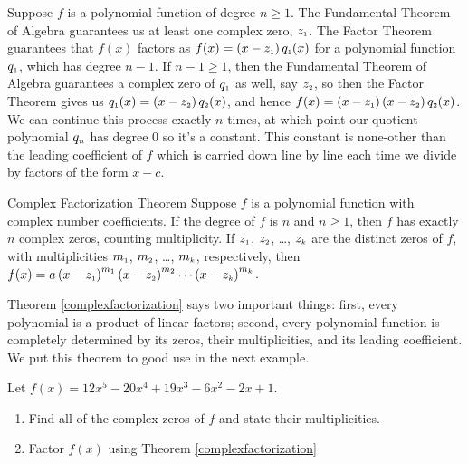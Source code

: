 Suppose  $f$ is a polynomial function of degree $n \geq 1$.  The Fundamental Theorem of Algebra guarantees us at least one complex zero, $z_{\mbox{\tiny $1$}}$.  The Factor Theorem guarantees that $f(x)$ factors as $f(x) = \left(x - z_{\mbox{\tiny $1$}}\right) q_{\mbox{\tiny $1$}}(x)$ for a polynomial function $q_{\mbox{\tiny $1$}}$,  which has degree $n-1$.  If $n-1 \geq 1$, then the Fundamental Theorem of Algebra guarantees a complex zero of $q_{\mbox{\tiny $1$}}$ as well, say $z_{\mbox{\tiny $2$}}$, so then the Factor Theorem gives us $q_{\mbox{\tiny $1$}}(x) = \left(x - z_{\mbox{\tiny $2$}}\right) q_{\mbox{\tiny $2$}}(x)$, and hence $f(x) = \left(x - z_{\mbox{\tiny $1$}}\right) \left(x - z_{\mbox{\tiny $2$}}\right) q_{\mbox{\tiny $2$}}(x)$.  We can continue this process exactly $n$ times, at which point our quotient polynomial $q_{\mbox{\tiny $n$}}$ has degree $0$ so it's a constant.  This constant is none-other than the leading coefficient of $f$ which is carried down line by line each time we divide by factors of the form $x-c$.


\begin{theorem1}[complexfactorization]{Complex Factorization Theorem} Suppose $f$ is a polynomial function with complex number coefficients.  If the degree of $f$ is $n$ and $n \geq 1$, then  $f$ has exactly $n$ complex zeros, counting multiplicity.  If $z_{\mbox{\tiny $1$}}$, $z_{\mbox{\tiny $2$}}$, \ldots, $z_{\mbox{\tiny $k$}}$ are the distinct zeros of $f$, with multiplicities $m_{\mbox{\tiny $1$}}$, $m_{\mbox{\tiny $2$}}$, \ldots, $m_{\mbox{\tiny $k$}}$, respectively, then $f(x) = a\left(x - z_{\mbox{\tiny $1$}}  \right)^{m_{\mbox{\tiny $1$}}}\left(x - z_{\mbox{\tiny $2$}}  \right)^{m_{\mbox{\tiny $2$}}} \cdots \left(x - z_{\mbox{\tiny $k$}}  \right)^{m_{\mbox{\tiny $k$}}}$. 

\end{theorem1}


Theorem \ref{complexfactorization} says two important things:  first, every polynomial is a product of linear factors;  second, every polynomial function is completely determined by its zeros, their multiplicities, and its leading coefficient.  We put this theorem to good use in the next example.

\begin{example}  Let $f(x) = 12x^5 - 20x^4+19x^3-6x^2-2x+1$.

\begin{enumerate}

\item Find all of the complex zeros of $f$ and state their multiplicities.  

\item  Factor $f(x)$ using Theorem \ref{complexfactorization}

\end{enumerate}

\end{example}

